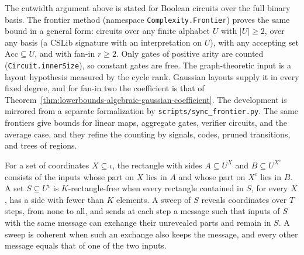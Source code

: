 The cutwidth argument above is stated for Boolean circuits over the full binary
basis. The frontier method (namespace \texttt{Complexity.Frontier}) proves the
same bound in a general form: circuits over any finite alphabet $U$ with
$|U|\ge2$, over any basis (a CSLib signature with an interpretation on $U$),
with any accepting set $\mathrm{Acc}\subseteq U$, and with fan-in $r\ge2$. Only
gates of positive arity are counted (\texttt{Circuit.innerSize}), so constant
gates are free. The graph-theoretic input is a layout hypothesis measured by
the cycle rank. Gaussian layouts supply it in every fixed degree, and for fan-in
two the coefficient is that of
Theorem~\ref{thm:lowerbounds-algebraic-gaussian-coefficient}. The development is
mirrored from a separate formalization by \texttt{scripts/sync\_frontier.py}. The same frontiers give bounds for linear maps, aggregate gates,
verifier circuits, and the average case, and they refine the counting by
signals, codes, pruned transitions, and trees of regions.

\begin{definition}
  \label{def:lowerbounds-frontier-sweep}
  \leanok
  For a set of coordinates $X\subseteq\iota$, the rectangle with sides
  $A\subseteq U^X$ and $B\subseteq U^{X^c}$ consists of the inputs whose part on
  $X$ lies in $A$ and whose part on $X^c$ lies in $B$. A set $S\subseteq U^\iota$
  is $K$-rectangle-free when every rectangle contained in $S$, for every $X$, has
  a side with fewer than $K$ elements. A sweep of $S$ reveals coordinates over
  $T$ steps, from none to all, and sends at each step a message such that inputs
  of $S$ with the same message can exchange their unrevealed parts and remain in
  $S$. A sweep is coherent when such an exchange also keeps the message, and
  every other message equals that of one of the two inputs.
\end{definition}

